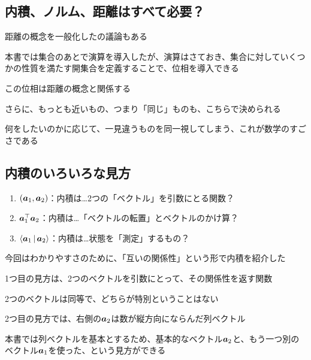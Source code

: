 \documentclass[../book_half_step_linear]{subfiles}
\begin{document}
\sectionline
\subsection{内積、ノルム、距離はすべて必要？}

距離の概念を一般化したの議論もある

本書では集合のあとで演算を導入したが、演算はさておき、集合に対していくつかの性質を満たす開集合を定義することで、位相を導入できる

この位相は距離の概念と関係する

さらに、もっとも近いもの、つまり「同じ」ものも、こちらで決められる

\br

何をしたいのかに応じて、一見違うものを同一視してしまう、これが数学のすごさである

\sectionline
\subsection{内積のいろいろな見方}

\begin{enumerate}
  \item $(\vb*{a}_1,\vb*{a}_2)$：内積は…2つの「ベクトル」を引数にとる関数？
  \item $\vb*{a}_1^\top \vb*{a}_2$：内積は…「ベクトルの転置」とベクトルのかけ算？
  \item $\Braket{\vb*{a}_1|\vb*{a}_2}$：内積は…状態を「測定」するもの？
\end{enumerate}

今回はわかりやすさのために、「互いの関係性」という形で内積を紹介した

1つ目の見方は、2つのベクトルを引数にとって、その関係性を返す関数

2つのベクトルは同等で、どちらが特別ということはない

\br

2つ目の見方では、右側の$\vb*{a}_2$は数が縦方向にならんだ列ベクトル

本書では列ベクトルを基本とするため、基本的なベクトル$\vb*{a}_2$と、もう一つ別のベクトル$\vb*{a}_1$を使った、という見方ができる
\end{document}

